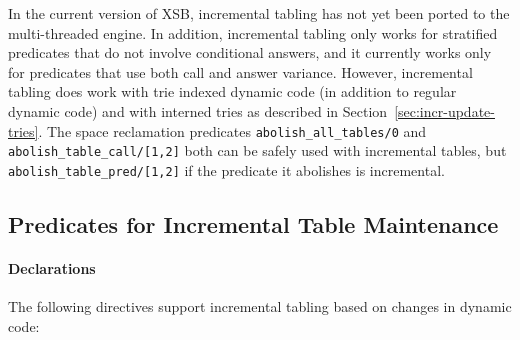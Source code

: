 In the current version of XSB, incremental tabling has not yet been
ported to the multi-threaded engine.  In addition, incremental tabling
only works for stratified predicates that do not involve conditional
answers, and it currently works only for predicates that use both call
and answer variance.  However, incremental tabling does work with
trie indexed dynamic code (in addition to regular dynamic code) and
with interned tries as described in
Section~\ref{sec:incr-update-tries}.  The space reclamation predicates
{\tt abolish\_all\_tables/0} and {\tt abolish\_table\_call/[1,2]} both
can be safely used with incremental tables, but {\tt
  abolish\_table\_pred/[1,2]} if the predicate it abolishes is
incremental.

\subsection{Predicates for Incremental Table Maintenance} \label{sec:incr-preds1}

\paragraph{Declarations} The following directives support incremental
tabling based on changes in dynamic code: 


